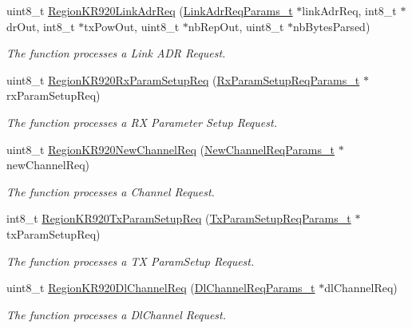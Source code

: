 \begin{DoxyCompactItemize}
uint8\+\_\+t \hyperlink{group__REGIONKR920_ga6b2ee965ec46d0c137845d75edc16fd8}{Region\+K\+R920\+Link\+Adr\+Req} (\hyperlink{group__REGION_gad4af503e8d4de1846129e26a799a1e8e}{Link\+Adr\+Req\+Params\+\_\+t} $\ast$link\+Adr\+Req, int8\+\_\+t $\ast$dr\+Out, int8\+\_\+t $\ast$tx\+Pow\+Out, uint8\+\_\+t $\ast$nb\+Rep\+Out, uint8\+\_\+t $\ast$nb\+Bytes\+Parsed)
\begin{DoxyCompactList}\small\item\em The function processes a Link A\+DR Request. \end{DoxyCompactList}\item 
uint8\+\_\+t \hyperlink{group__REGIONKR920_gabf2aca4c3d3b1bbe87d18a1b218fbe3b}{Region\+K\+R920\+Rx\+Param\+Setup\+Req} (\hyperlink{group__REGION_ga7165f282c670c728c36d534df2285157}{Rx\+Param\+Setup\+Req\+Params\+\_\+t} $\ast$rx\+Param\+Setup\+Req)
\begin{DoxyCompactList}\small\item\em The function processes a RX Parameter Setup Request. \end{DoxyCompactList}\item 
uint8\+\_\+t \hyperlink{group__REGIONKR920_gab6853b28eeb36ffabfe8c7c77bcd305d}{Region\+K\+R920\+New\+Channel\+Req} (\hyperlink{group__REGION_gae2abcdb6dbb843c9faf5fd3009eca9d6}{New\+Channel\+Req\+Params\+\_\+t} $\ast$new\+Channel\+Req)
\begin{DoxyCompactList}\small\item\em The function processes a Channel Request. \end{DoxyCompactList}\item 
int8\+\_\+t \hyperlink{group__REGIONKR920_ga97e34a3dd6ff9962dfc73cbeadb5119d}{Region\+K\+R920\+Tx\+Param\+Setup\+Req} (\hyperlink{group__REGION_ga26836ef2996e70410e42ef471073f855}{Tx\+Param\+Setup\+Req\+Params\+\_\+t} $\ast$tx\+Param\+Setup\+Req)
\begin{DoxyCompactList}\small\item\em The function processes a TX Param\+Setup Request. \end{DoxyCompactList}\item 
uint8\+\_\+t \hyperlink{group__REGIONKR920_gaf071acd0ac6c6839c90ff7ee9192fbf6}{Region\+K\+R920\+Dl\+Channel\+Req} (\hyperlink{group__REGION_gae0d608ff1f8ea0a430e4f9a4c38ec7f3}{Dl\+Channel\+Req\+Params\+\_\+t} $\ast$dl\+Channel\+Req)
\begin{DoxyCompactList}\small\item\em The function processes a Dl\+Channel Request. \end{DoxyCompactList}\item 

\end{DoxyCompactItemize}
